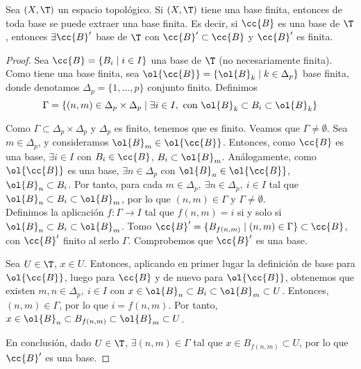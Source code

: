 \begin{prop}
    Sea $(X,\T)$ un espacio topológico. Si $(X,\T)$ tiene una base finita, entonces de toda base se puede extraer una base finita. Es decir, si $\cc{B}$ es una base de $\T$, entonces $\exists \cc{B}'$ base de $\T$ con $\cc{B}'\subset \cc{B}$ y $\cc{B}'$ es finita.
\end{prop}
\begin{proof}
    Sea $\cc{B}=\{B_i\mid i\in I\}$ una base de $\T$ (no necesariamente finita). Como tiene una base finita, sea $\ol{\cc{B}}=\{\ol{B}_k\mid k\in \Delta_p\}$ base finita, donde denotamos $\Delta_p=\{1,\dots,p\}$ conjunto finito. Definimos
    $$\Gamma = \{(n,m)\in \Delta_p\times \Delta_p\mid \exists i\in I,\text{ con } \ol{B}_k \subset B_i\subset \ol{B}_k\}$$

    Como $\Gamma \subset \Delta_p\times \Delta_p$ y $\Delta_p$ es finito, tenemos que es finito. Veamos que $\Gamma\neq \emptyset$. Sea $m\in \Delta_p$, y consideramos $\ol{B}_m\in \ol{\cc{B}}$. Entonces, como $\cc{B}$ es una base, $\exists i\in I$ con $B_i\in \cc{B}$, $B_i\subset \ol{B}_m$. Análogamente, como $\ol{\cc{B}}$ es una base, $\exists n\in \Delta_p$ con $\ol{B}_n\in \ol{\cc{B}}$, $\ol{B}_n\subset B_i$. Por tanto, para cada $m\in \Delta_p,~\exists n\in \Delta_p,~i\in I$ tal que $\ol{B}_n \subset B_i\subset \ol{B}_m$, por lo que $(n,m)\in \Gamma$ y $\Gamma\neq \emptyset$.\\
    
    Definimos la aplicación $f:\Gamma\to I$ tal que $f(n,m)=i$ si y solo si $\ol{B}_n\subset B_{i}\subset \ol{B}_m$. Tomo $\cc{B}'=\{B_{f(n,m)}\mid (n,m)\in \Gamma\}\subset \cc{B}$, con $\cc{B}'$ finito al serlo $\Gamma$. Comprobemos que $\cc{B}'$ es una base.

    Sea $U\in \T$, $x\in U$. Entonces, aplicando en primer lugar la definición de base para $\ol{\cc{B}}$, luego para $\cc{B}$ y de nuevo para $\ol{\cc{B}}$, obtenemos que existen $m,n\in \Delta_p,~i\in I$ con $x\in \ol{B}_n\subset B_i\subset \ol{B}_m\subset U$. Entonces, $(n,m)\in \Gamma$, por lo que $i=f(n,m)$. Por tanto, $x\in \ol{B}_n\subset B_{f(n,m)}\subset \ol{B}_m\subset U$.
    
    En conclusión, dado $U\in \T$, $\exists (n,m)\in \Gamma$ tal que $x\in B_{f(n,m)}\subset U$, por lo que $\cc{B}'$ es una base.
\end{proof}

